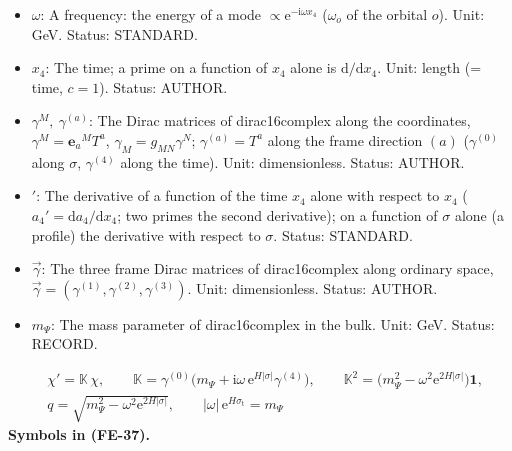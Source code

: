 \documentclass[
  10pt,
]{article}
\begin{document}
\begin{itemize}
\item
  \(\omega\): A frequency: the energy of a mode
  \(\propto \mathrm{e}^{-\mathrm{i}\omega x_4}\) (\(\omega_o\) of the
  orbital \(o\)). Unit: GeV. Status: STANDARD.
\item
  \(x_4\): The time; a prime on a function of \(x_4\) alone is
  \(\mathrm{d}/\mathrm{d}x_4\). Unit: length (= time, \(c = 1\)).
  Status: AUTHOR.
\item
  \(\gamma^M,\ \gamma^{(a)}\): The Dirac matrices of dirac16complex
  along the coordinates, \(\gamma^M = \mathbf{e}_a{}^MT^a\),
  \(\gamma_M = g_{MN}\gamma^N\); \(\gamma^{(a)} = T^a\) along the frame
  direction \((a)\) (\(\gamma^{(0)}\) along \(\sigma\), \(\gamma^{(4)}\)
  along the time). Unit: dimensionless. Status: AUTHOR.
\item
  \({}'\): The derivative of a function of the time \(x_4\) alone with
  respect to \(x_4\) (\(a_4' = \mathrm{d}a_4/\mathrm{d}x_4\); two primes
  the second derivative); on a function of \(\sigma\) alone (a profile)
  the derivative with respect to \(\sigma\). Status: STANDARD.
\item
  \(\vec\gamma\): The three frame Dirac matrices of dirac16complex along
  ordinary space,
  \(\vec\gamma = (\gamma^{(1)}, \gamma^{(2)}, \gamma^{(3)})\). Unit:
  dimensionless. Status: AUTHOR.
\item
  \(m_\Psi\): The mass parameter of dirac16complex in the bulk. Unit:
  GeV. Status: RECORD.
\end{itemize}

\[
\begin{aligned}
&\chi' = \mathbb{K}\,\chi,\qquad \mathbb{K} = \gamma^{(0)}\big(m_\Psi + \mathrm{i}\omega\,\mathrm{e}^{H\lvert\sigma\rvert}\gamma^{(4)}\big),\qquad
\mathbb{K}^2 = \big(m_\Psi^2 - \omega^2\mathrm{e}^{2H\lvert\sigma\rvert}\big)\mathbf{1},\\
&q = \sqrt{m_\Psi^2 - \omega^2\mathrm{e}^{2H\lvert\sigma\rvert}},\qquad \lvert\omega\rvert\,\mathrm{e}^{H\sigma_{\mathrm{t}}} = m_\Psi
\end{aligned} \tag{FE-37}
\] \textbf{Symbols in (FE-37).}
\end{document}
